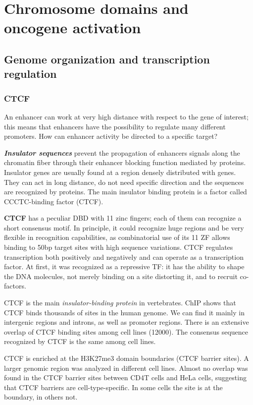 \graphicspath{{chapters/_resources/}}

\chapter{Chromosome domains and oncogene activation}

\section{Genome organization and transcription regulation}

\subsection{CTCF}
An enhancer can work at very high distance with respect to the gene of interest; this means that enhancers have the possibility to regulate many different promoters. How can enhancer activity be directed to a specific target?

\textbf{\emph{Insulator sequences}} prevent the propagation of enhancers signals along the chromatin fiber through their enhancer blocking function mediated by proteins. Insulator genes are usually found at a region densely distributed with genes. They can act in long distance, do not need specific direction and the sequences are recognized by proteins. The main insulator binding protein is a factor called CCCTC-binding factor (CTCF).

\textbf{CTCF} has a peculiar DBD with 11 zinc fingers; each of them can recognize a short consensus motif. In principle, it could recognize huge regions and be very flexible in recognition capabilities, as combinatorial use of its 11 ZF allows binding to 50bp target sites with high sequence variations. CTCF regulates transcription both positively and negatively and can operate as a transcription factor. At first, it was recognized as a repressive TF: it has the ability to shape the DNA molecules, not merely binding on a site distorting it, and to recruit co-factors.

CTCF is the main \emph{insulator-binding protein} in vertebrates. ChIP shows that CTCF binds thousands of sites in the human genome. We can find it mainly in intergenic regions and introns, as well as promoter regions. There is an extensive overlap of CTCF binding sites among cell lines (12000). The consensus sequence recognized by CTCF is the same among cell lines.

CTCF is enriched at the H3K27me3 domain boundaries (CTCF barrier sites). A larger genomic region was analyzed in different cell lines. Almost no overlap was found in the CTCF barrier sites between CD4T cells and HeLa cells, suggesting that CTCF barriers are cell-type-specific. In some cells the site is at the boundary, in others not.

